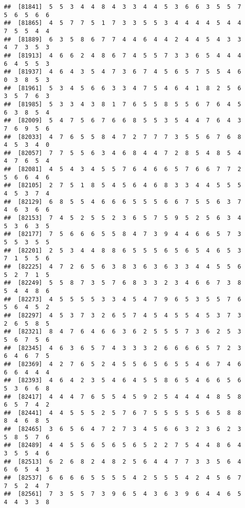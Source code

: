 \documentclass[
]{book}
\begin{document}
\begin{verbatim}
##  [81841]  5  5  3  4  4  8  4  3  3  4  4  5  3  6  6  3  5  5  7  5  6  5  6  6
##  [81865]  4  5  7  7  5  1  7  3  3  5  5  3  4  4  4  4  5  4  4  7  5  5  4  4
##  [81889]  6  3  5  8  6  7  7  4  4  6  4  4  2  4  4  5  4  3  3  4  7  3  5  3
##  [81913]  4  6  6  2  4  8  6  7  4  5  5  7  3  3  6  5  4  4  4  6  4  5  5  3
##  [81937]  4  6  4  3  5  4  7  3  6  7  4  5  6  5  7  5  5  4  6  0  3  8  5  3
##  [81961]  5  3  4  5  6  6  3  3  4  7  5  4  6  4  1  8  2  5  6  3  5  7  6  3
##  [81985]  5  3  3  4  3  8  1  7  6  5  5  8  5  5  6  7  6  4  5  6  3  8  5  4
##  [82009]  5  4  7  5  6  7  6  6  8  5  5  3  5  4  4  7  6  4  3  7  6  9  5  6
##  [82033]  4  7  6  5  5  8  4  7  2  7  7  7  3  5  5  6  7  6  8  4  5  3  4  0
##  [82057]  7  7  5  5  6  3  4  6  8  4  4  7  2  8  5  4  8  5  4  4  7  6  5  4
##  [82081]  4  5  4  3  4  5  5  7  6  4  6  6  5  7  6  6  7  7  2  5  6  6  4  6
##  [82105]  2  7  5  1  8  5  4  5  6  4  6  8  3  3  4  4  5  5  5  4  5  3  7  4
##  [82129]  6  8  5  5  4  6  6  6  5  5  5  6  6  7  5  5  6  3  7  4  6  3  6  6
##  [82153]  7  4  5  2  5  5  2  3  6  5  7  5  9  5  2  5  6  3  4  5  3  6  3  5
##  [82177]  7  5  6  6  6  5  5  8  4  7  3  9  4  4  6  6  5  7  3  5  5  3  5  5
##  [82201]  2  5  3  4  4  8  8  6  5  5  5  6  5  6  5  4  6  5  3  7  1  5  5  6
##  [82225]  4  7  2  6  5  6  3  8  3  6  3  6  3  3  4  4  5  5  6  5  2  7  1  5
##  [82249]  5  5  8  7  3  5  7  6  8  3  3  2  3  4  6  6  7  3  8  5  4  4  8  6
##  [82273]  4  5  5  5  5  3  3  4  5  4  7  9  6  5  3  5  5  7  6  5  6  4  5  2
##  [82297]  4  5  3  7  3  2  6  5  7  4  5  4  5  5  4  5  3  7  3  2  6  5  8  5
##  [82321]  8  4  7  6  4  6  6  3  6  2  5  5  5  7  3  6  2  5  3  5  6  7  5  6
##  [82345]  4  6  3  6  5  7  4  3  3  3  2  6  6  6  6  5  7  2  3  6  4  6  7  5
##  [82369]  4  2  7  6  5  2  4  5  5  6  5  6  5  5  4  6  7  4  6  6  6  4  4  4
##  [82393]  4  6  4  2  3  5  4  6  4  5  5  8  6  5  4  6  6  5  6  5  3  6  6  8
##  [82417]  4  4  4  7  6  5  5  4  5  9  2  5  4  4  4  4  8  5  8  6  5  7  4  2
##  [82441]  4  4  5  5  5  2  5  7  6  7  5  5  5  5  5  6  5  8  8  8  4  6  8  5
##  [82465]  3  6  5  6  4  7  2  7  3  4  5  6  6  3  2  3  6  2  3  5  8  5  7  6
##  [82489]  4  4  5  5  6  5  6  5  6  5  2  2  7  5  4  4  8  6  4  3  5  5  4  6
##  [82513]  6  2  6  8  2  4  8  2  5  6  4  4  7  7  3  3  5  6  4  6  6  5  4  3
##  [82537]  6  6  6  6  5  5  5  5  4  2  5  5  5  4  2  4  5  6  7  7  5  2  4  7
##  [82561]  7  3  5  5  7  3  9  6  5  4  3  6  3  9  6  4  4  6  5  4  4  3  3  8

\end{verbatim}
\end{document}
